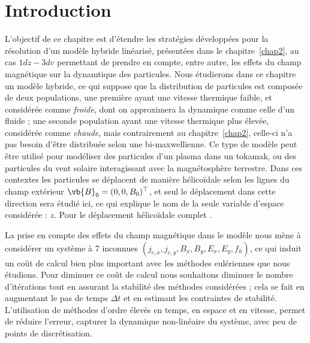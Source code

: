 
\section{Introduction}

L'objectif de ce chapitre est d'étendre les stratégies développées pour la résolution d'un modèle hybride linéarisé, présentées dans le chapitre~\ref{chap2}, au cas $1dz-3dv$ permettant de prendre en compte, entre autre, les effets du champ magnétique sur la dynamtique des particules. Nous étudierons dans ce chapitre un modèle hybride, ce qui suppose que la distribution de particules est composée de deux populations, une première ayant une vitesse thermique faible, et considérée comme \emph{froide}, dont on approximera la dynamique comme celle d'un fluide ; une seconde population ayant une vitesse thermique plus élevée, considérée comme \emph{chaude}, mais contrairement au chapitre~\ref{chap2}, celle-ci n'a pas besoin d'être distribuée selon une bi-maxwellienne. Ce type de modèle peut être utilisé pour modéliser des particules d'un plasma dans un tokamak, ou des particules du vent solaire interagissant avec la magnétosphère terrestre. Dans ces contextes les particules se déplacent de manière hélicoïdale selon les lignes du champ extérieur $\vb{B}_0 = (0,0,B_0)^\top$, et seul le déplacement dans cette direction sera étudié ici, ce qui explique le nom de la seule variable d'espace considérée : $z$. Pour le déplacement hélicoïdale complet .

La prise en compte des effets du champ magnétique dans le modèle nous mène à considérer un système à 7 inconnues $(j_{c,x},j_{c,y},B_x,B_y,E_x,E_y,f_h)$, ce qui induit un coût de calcul bien plus important avec les méthodes eulériennes que nous étudions. Pour diminuer ce coût de calcul nous souhaitons diminuer le nombre d'itérations tout en assurant la stabilité des méthodes considérées ; cela se fait en augmentant le pas de temps $\Delta t$ et en estimant les contraintes de stabilité. L'utilisation de méthodes d'ordre élevés en temps, en espace et en vitesse, permet de réduire l'erreur, capturer la dynamique non-linéaire du système, avec peu de points de discrétisation.

